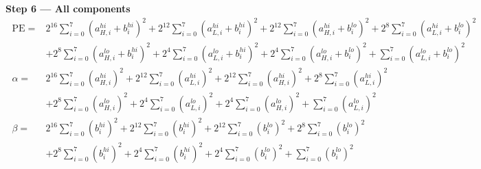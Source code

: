 \documentclass[fleqn]{article}
\begin{document}
\textbf{Step 6 --- All components}
\[
\boxed{\;
\begin{aligned}
\mathrm{PE} ={}& 2^{16}\sum_{i=0}^{7}(a_{H,i}^{hi}{+}b_i^{hi})^2 + 2^{12}\sum_{i=0}^{7}(a_{L,i}^{hi}{+}b_i^{hi})^2 + 2^{12}\sum_{i=0}^{7}(a_{H,i}^{hi}{+}b_i^{lo})^2 + 2^{8}\sum_{i=0}^{7}(a_{L,i}^{hi}{+}b_i^{lo})^2 \\
  & + 2^{8}\sum_{i=0}^{7}(a_{H,i}^{lo}{+}b_i^{hi})^2 + 2^{4}\sum_{i=0}^{7}(a_{L,i}^{lo}{+}b_i^{hi})^2 + 2^{4}\sum_{i=0}^{7}(a_{H,i}^{lo}{+}b_i^{lo})^2 + \sum_{i=0}^{7}(a_{L,i}^{lo}{+}b_i^{lo})^2 \\[0.6em]
\alpha ={}& 2^{16}\sum_{i=0}^{7}(a_{H,i}^{hi})^2 + 2^{12}\sum_{i=0}^{7}(a_{L,i}^{hi})^2 + 2^{12}\sum_{i=0}^{7}(a_{H,i}^{hi})^2 + 2^{8}\sum_{i=0}^{7}(a_{L,i}^{hi})^2 \\
  & + 2^{8}\sum_{i=0}^{7}(a_{H,i}^{lo})^2 + 2^{4}\sum_{i=0}^{7}(a_{L,i}^{lo})^2 + 2^{4}\sum_{i=0}^{7}(a_{H,i}^{lo})^2 + \sum_{i=0}^{7}(a_{L,i}^{lo})^2 \\[0.6em]
\beta ={}& 2^{16}\sum_{i=0}^{7}(b_i^{hi})^2 + 2^{12}\sum_{i=0}^{7}(b_i^{hi})^2 + 2^{12}\sum_{i=0}^{7}(b_i^{lo})^2 + 2^{8}\sum_{i=0}^{7}(b_i^{lo})^2 \\
  & + 2^{8}\sum_{i=0}^{7}(b_i^{hi})^2 + 2^{4}\sum_{i=0}^{7}(b_i^{hi})^2 + 2^{4}\sum_{i=0}^{7}(b_i^{lo})^2 + \sum_{i=0}^{7}(b_i^{lo})^2
\end{aligned}
\;}
\]
\end{document}
